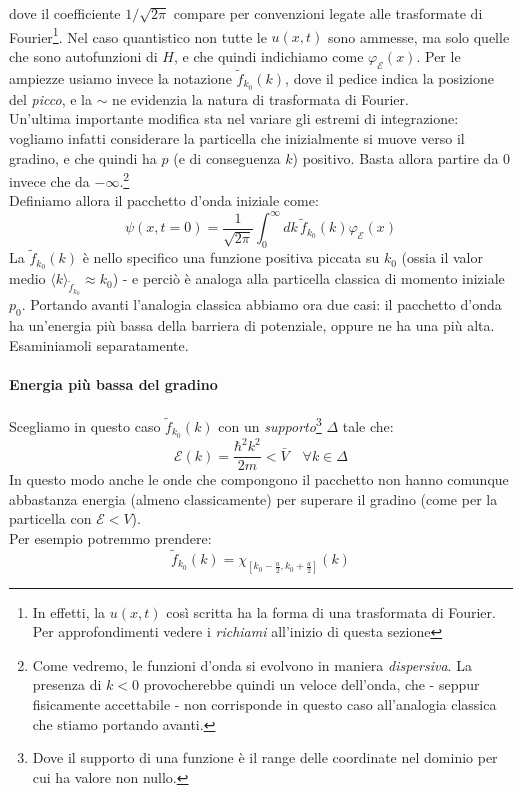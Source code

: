 \documentclass[../../FisicaTeorica.tex]{subfiles}
\begin{document}
dove il coefficiente $1/\sqrt{2\pi}$ compare per convenzioni legate alle trasformate di Fourier\footnote{In effetti, la $u(x,t)$ così scritta ha la forma di una trasformata di Fourier. Per approfondimenti vedere i \textit{richiami} all'inizio di questa sezione}. 
Nel caso quantistico non tutte le $u(x,t)$ sono ammesse, ma solo quelle che sono autofunzioni di $H$, e che quindi indichiamo come $\varphi_{\mathcal{E}}(x)$. Per le ampiezze usiamo invece la notazione $\tilde{f}_{k_0}(k)$, dove il pedice indica la posizione del \textit{picco}, e la $\sim$ ne evidenzia la natura di trasformata di Fourier.\\
Un'ultima importante modifica sta nel variare gli estremi di integrazione: vogliamo infatti considerare la particella che inizialmente si muove verso il gradino, e che quindi ha $p$ (e di conseguenza $k$) positivo. Basta allora partire da $0$ invece che da $-\infty$.\footnote{Come vedremo, le funzioni d'onda si evolvono in maniera \textit{dispersiva}. La presenza di $k<0$ provocherebbe quindi un veloce  dell'onda, che - seppur fisicamente accettabile - non corrisponde in questo caso all'analogia classica che stiamo portando avanti.}\\
Definiamo allora il pacchetto d'onda iniziale come:
\begin{equation}
\psi(x,t=0)=\frac{1}{\sqrt{2\pi}}\int_0^{\infty} dk\,\tilde{f}_{k_0}(k) \varphi_\mathcal{E}(x)
\label{eqn:pacchettoiniziale}
\end{equation}
La $\tilde{f}_{k_0}(k)$ è nello specifico una funzione positiva piccata su $k_0$ (ossia il valor medio $\langle k\rangle_{\tilde{f}_{k_0}}\approx k_0$) - e perciò è analoga alla particella classica di momento iniziale $p_0$. Portando avanti l'analogia classica abbiamo ora due casi: il pacchetto d'onda ha  un'energia più bassa della barriera di potenziale, oppure ne ha una più alta. Esaminiamoli separatamente.
\paragraph{Energia più bassa del gradino}
Scegliamo in questo caso $\tilde{f}_{k_0}(k)$ con un \textit{supporto}\footnote{Dove il supporto di una funzione  è il range delle coordinate nel dominio per cui ha valore non nullo.} $\Delta$ tale che:
\[
\mathcal{E}(k) =
\frac{\hbar^2 k^2}{2m}<\bar{V} \quad \forall k\in \Delta
\]
In questo modo anche le onde  che compongono il pacchetto non hanno comunque abbastanza energia (almeno classicamente) per superare il gradino (come per la particella con $\mathcal{E}<V$).\\
Per esempio potremmo prendere:
\[
\tilde{f}_{k_0}(k)=\chi_{\left[k_0-\frac{a}{2}, k_0+\frac{a}{2}\right]}(k)
\]
\end{document}
